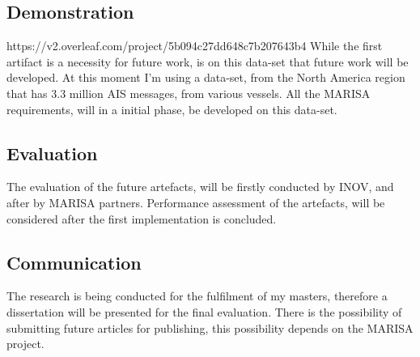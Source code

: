 \subsection{Demonstration}https://v2.overleaf.com/project/5b094c27dd648c7b207643b4
While the first artifact is a necessity for future work, is on this data-set that future work will be developed. At this moment I'm using a data-set, from the North America region that has 3.3 million AIS messages, from various vessels.
All the MARISA requirements, will in a initial phase, be developed on this data-set.
\subsection{Evaluation}
The evaluation of the future artefacts, will be firstly conducted by INOV, and after by MARISA partners.
Performance assessment of the artefacts, will be considered after the first implementation is concluded.

\subsection{Communication} 
The research is being conducted for the fulfilment of my masters, therefore a dissertation will be presented for the final evaluation. There is the possibility of submitting future articles for publishing, this possibility depends on the MARISA project.
